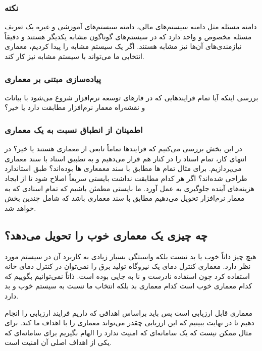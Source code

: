 \subsubsection*{نکته}

دامنه مسئله مثل دامنه سیستم‌های مالی، دامنه سیستم‌های آموزشی و غیره یک تعریف
مسئله مخصوص و واحد دارد که در سیستم‌های گوناگون مشابه یکدیگر هستند و دقیقاً
نیازمندی‌های آن‌ها نیز مشابه هستند. اگر یک سیستم مشابه را پیدا کردیم، معماری
انتخابی ما می‌تواند با سیستم مشابه نیز کار کند.

\subsubsection{پیاده‌سازی مبتنی بر معماری}

بررسی اینکه آیا تمام فرایند‌هایی که در فاز‌های توسعه نرم‌افزار شروع می‌شود با
بیانات و نقشه‌راه معمار نرم‌افزار مطابقت دارد یا خیر؟

\subsubsection{اطمینان از انطباق نسبت به یک معماری}

در این بخش بررسی می‌کنیم که فرایند‌ها تماماً تابعی از معماری هستند یا خیر؟ در
انتهای کار، تمام‌ اسناد را در کنار هم قرار می‌دهیم و به تطبیق اسناد با سند
معماری می‌پردازیم. برای مثال تمام ها مطابق با سند معمعاری
ها بوده‌اند؟ طبق استاندارد طراحی شده‌اند؟ اگر هر کدام مطابقت نداشت
بایستی سریعاً اصلاح شود تا از ایجاد هزینه‌های آینده جلوگیری به عمل آورد. ما
بایستی مطمئن باشیم که تمام اسنادی که به معمار نرم‌افزار تحویل می‌دهیم مطابق با
سند معماری باشد که شامل چندین بخش خواهد شد.

\subsection{چه چیزی یک معماری خوب را تحویل می‌دهد؟}

هیچ چیز ذاتاً خوب یا بد نیست بلکه واسبتگی بسیار زیادی به کاربرد آن در سیستم مورد
نظر دارد. معماری کنترل دمای یک نیروگاه تولید برق را نمی‌توان در کنترل دمای خانه
استفاده کرد چون استفاده نادرست و نا به جایی بوده است. ذاتاً نمی‌توانیم بگوییم که
کدام معماری خوب است کدام معماری بد بلکه انتخاب ما نسبت به سیستم خوب و بد دارد.

معماری قابل ارزیابی است پس باید براساس اهدافی که داریم فرایند ارزیابی را انجام
دهیم تا در نهایت ببینیم که این ارزیابی چقدر می‌تواند معماری را با اهداف ما
 کند. برای مثال ممکن نیست که یک سامانه‌ای که امنیت ندارد را الهام
بگیریم برای سامانه‌ای که یکی از اهداف اصلی آن امنیت است.

